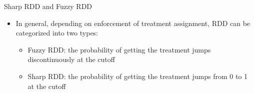 \documentclass[dvipsnames,hyperref={pdfpagelabels=false}]{beamer}
\begin{document}
\begin{frame}{Sharp RDD and Fuzzy RDD}{}
	
	\begin{itemize} 
		
		\item In general, depending on enforcement of treatment assignment, RDD can be categorized into two types:
		
				\begin{itemize} 	
		\vspace{0.2cm}
		
				\item[1] {\color{blue}Fuzzy RDD}: the probability of getting the treatment jumps discontinuously at the cutoff 
		\vspace{0.2cm}
		
		\item[2] {\color{blue}Sharp RDD}: the probability of getting the treatment jumps from 0 to 1 at the cutoff 

%			
%			
		\vspace{0.2cm}
		

%			
		
			\end{itemize}
		
	\end{itemize}
\end{frame}
\end{document}
